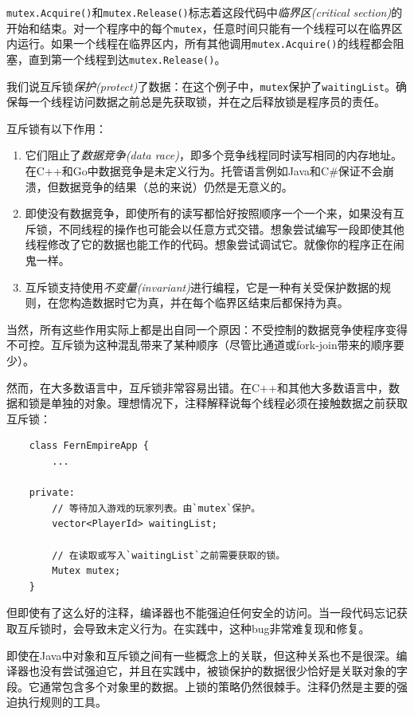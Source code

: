 \texttt{mutex.Acquire()}和\texttt{mutex.Release()}标志着这段代码中\emph{临界区(critical section)}的开始和结束。对一个程序中的每个\texttt{mutex}，任意时间只能有一个线程可以在临界区内运行。如果一个线程在临界区内，所有其他调用\texttt{mutex.Acquire()}的线程都会阻塞，直到第一个线程到达\texttt{mutex.Release()}。

我们说互斥锁\emph{保护(protect)}了数据：在这个例子中，\texttt{mutex}保护了\texttt{waitingList}。确保每一个线程访问数据之前总是先获取锁，并在之后释放锁是程序员的责任。

互斥锁有以下作用：
\begin{enumerate}
    \item 它们阻止了\emph{数据竞争(data race)}，即多个竞争线程同时读写相同的内存地址。在C++和Go中数据竞争是未定义行为。托管语言例如Java和C\#保证不会崩溃，但数据竞争的结果（总的来说）仍然是无意义的。
    \item 即使没有数据竞争，即使所有的读写都恰好按照顺序一个一个来，如果没有互斥锁，不同线程的操作也可能会以任意方式交错。想象尝试编写一段即使其他线程修改了它的数据也能工作的代码。想象尝试调试它。就像你的程序正在闹鬼一样。
    \item 互斥锁支持使用\emph{不变量(invariant)}进行编程，它是一种有关受保护数据的规则，在您构造数据时它为真，并在每个临界区结束后都保持为真。 
\end{enumerate}

当然，所有这些作用实际上都是出自同一个原因：不受控制的数据竞争使程序变得不可控。互斥锁为这种混乱带来了某种顺序（尽管比通道或fork-join带来的顺序要少）。

然而，在大多数语言中，互斥锁非常容易出错。在C++和其他大多数语言中，数据和锁是单独的对象。理想情况下，注释解释说每个线程必须在接触数据之前获取互斥锁：
\begin{verbatim}
    class FernEmpireApp {
        ...

    private:
        // 等待加入游戏的玩家列表。由`mutex`保护。
        vector<PlayerId> waitingList;

        // 在读取或写入`waitingList`之前需要获取的锁。
        Mutex mutex;
    }
\end{verbatim}

但即使有了这么好的注释，编译器也不能强迫任何安全的访问。当一段代码忘记获取互斥锁时，会导致未定义行为。在实践中，这种bug非常难复现和修复。

即使在Java中对象和互斥锁之间有一些概念上的关联，但这种关系也不是很深。编译器也没有尝试强迫它，并且在实践中，被锁保护的数据很少恰好是关联对象的字段。它通常包含多个对象里的数据。上锁的策略仍然很棘手。注释仍然是主要的强迫执行规则的工具。

